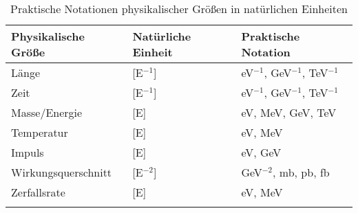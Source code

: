 \documentclass[12pt,a4paper]{article}
\begin{document}
	\begin{table}[ht]
		\centering
		\begin{adjustbox}{scale=1.2}
			\begin{tabular}{lll}
				\hline
				\textbf{Physikalische Größe} & \textbf{Natürliche Einheit} & \textbf{Praktische Notation} \\
				\hline
				Länge & [E$^{-1}$] & eV$^{-1}$, GeV$^{-1}$, TeV$^{-1}$ \\
				Zeit & [E$^{-1}$] & eV$^{-1}$, GeV$^{-1}$, TeV$^{-1}$ \\
				Masse/Energie & [E] & eV, MeV, GeV, TeV \\
				Temperatur & [E] & eV, MeV \\
				Impuls & [E] & eV, GeV \\
				Wirkungsquerschnitt & [E$^{-2}$] & GeV$^{-2}$, mb, pb, fb \\
				Zerfallsrate & [E] & eV, MeV \\
				\hline
			\multicolumn{2}{c}{} \\
				\hline
			\end{tabular}
		\end{adjustbox}
		\caption{Praktische Notationen physikalischer Größen in natürlichen Einheiten}
		\label{tab:practical_notation}
	\end{table}
	
\end{document}
